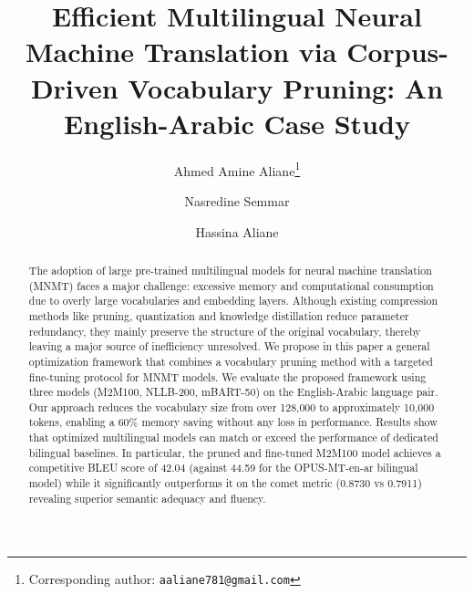 \documentclass{article}
\title{Efficient Multilingual Neural Machine Translation via Corpus-Driven Vocabulary Pruning: An English-Arabic Case Study}
\author[1,3]{Ahmed Amine Aliane\thanks{Corresponding author: \texttt{aaliane781@gmail.com}}}
\author[2]{Nasredine Semmar}
\author[3]{Hassina Aliane}
\affil[1]{Arabic Institute for Translation, Algiers, Algeria}
\affil[2]{CEA LIST, Paris-Saclay, France}
\affil[3]{CERIST, Algeria}
\begin{document}
	\maketitle
	
	\begin{abstract}
		The adoption of large pre-trained multilingual models for neural machine translation
		(MNMT) faces a major challenge: excessive memory and computational consumption due to
		overly large vocabularies and embedding layers. Although existing compression methods like
		pruning, quantization and knowledge distillation reduce parameter redundancy, they mainly
		preserve the structure of the original vocabulary, thereby leaving a major source of
		inefficiency unresolved. We propose in this paper a general optimization framework that
		combines a vocabulary pruning method with a targeted fine-tuning protocol for MNMT
		models. We evaluate the proposed framework using three models (M2M100, NLLB-200,
		mBART-50) on the English-Arabic language pair. Our approach reduces the vocabulary size
		from over 128,000 to approximately 10,000 tokens, enabling a 60\% memory saving without
		any loss in performance.
		Results show that optimized multilingual models can match or exceed the performance of
		dedicated bilingual baselines. In particular, the pruned and fine-tuned M2M100 model
		achieves a competitive BLEU score of 42.04 (against 44.59 for the OPUS-MT-en-ar bilingual
		model) while it significantly outperforms it on the comet metric (0.8730 vs 0.7911) revealing
		superior semantic adequacy and fluency.
	\end{abstract}
	
	
\end{document}
